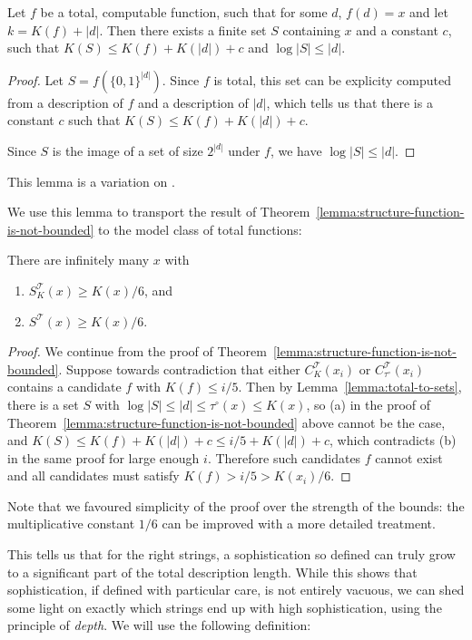 \documentclass{style/llncs}
\newcommand{\T}{\mathscr T}
\begin{document}
\begin{lemma}
Let $f$ be a total, computable function, such that for some $d$, $f(d) = x$ and let $k = K(f) + |d|$. Then there exists a finite set $S$ containing $x$ and a constant $c$, such that $K(S) \leq K(f) + K(|d|) + c$ and $\log |S| \leq |d|$.\label{lemma:total-to-sets}
\end{lemma}
\begin{proof}
Let $S = f\left(\{0,1\}^{|d|}\right)$. Since $f$ is total, this set can be explicity computed from a description of $f$ and a description of $|d|$, which tells us that there is a constant $c$ such that $K(S) \leq K(f) + K(|d|) + c$. 

Since $S$ is the image of a set of size $2^{|d|}$ under $f$, we have $\log |S| \leq |d|$.
\end{proof}
This lemma is a variation on \cite[Lemma~7.2]{vitanyi2004meaningful}.

We use this lemma to transport the result of Theorem~\ref{lemma:structure-function-is-not-bounded} to the model class of total functions:

\begin{theorem}
There are infinitely many $x$ with 
\begin{enumerate}
  \item $S^\T_K(x) \geq K(x)/6$, {and}\label{eq:poezenvoer}
  \item $S^\T(x) \geq K(x)/6$. \label{eq:hondevoer}
\end{enumerate}
\end{theorem}
\begin{proof}
We continue from the proof of Theorem~\ref{lemma:structure-function-is-not-bounded}. Suppose towards contradiction that either $C^\T_K(x_i)$ or $C^\T_{\tau^\circ}(x_i)$ contains a candidate $f$ with $K(f)\le i/5$. Then by Lemma~\ref{lemma:total-to-sets}, there is a set $S$ with $\log|S|\le|d|\le\tau^\circ(x)\le K(x)$, so (a) in the proof of Theorem~\ref{lemma:structure-function-is-not-bounded} above cannot be the case, and $K(S)\le K(f)+K(|d|)+c\le i/5+K(|d|)+c$, which contradicts (b) in the same proof for large enough $i$. Therefore such candidates $f$ cannot exist and all candidates must satisfy $K(f)>i/5>K(x_i)/6$.
\end{proof}
Note that we favoured simplicity of the proof over the strength of the bounds: the multiplicative constant $1/6$ can be improved with a more detailed treatment.

This tells us that for the right strings, a sophistication so defined can truly grow to a significant part of the total description length. While this shows that sophistication, if defined with particular care, is not entirely vacuous, we can shed some light on exactly which strings end up with high sophistication, using the principle of \emph{depth}. We will use the following definition:
\end{document}
